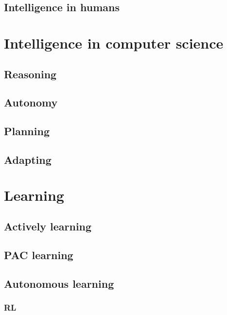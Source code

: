 \documentclass[12pt,a4paper,openright,twoside]{book}
\begin{document}
\subsection{Intelligence in humans}\label{subsec:intelligence-in-humans}

\section{Intelligence in computer science}\label{sec:intelligence-in-computer-science}

\subsection{Reasoning}\label{subsec:reasoning}

\subsection{Autonomy}\label{subsec:autonomy}

\subsection{Planning}\label{subsec:planning}

\subsection{Adapting}\label{subsec:adapting}

\section{Learning}\label{sec:learning}

\subsection{Actively learning}\label{subsec:actively-learning}

\subsection{\Acl{PAC} learning}\label{subsec:pac-learning}

\subsection{Autonomous learning}\label{subsec:autonomous-learning}

\subsubsection{\Acl{RL}}\label{subsubsec:rl}
\end{document}
